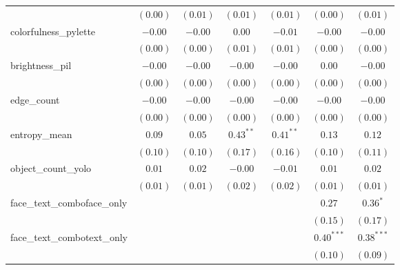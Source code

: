 \begin{table}
\begin{center}
\begin{tabular}{l c c c c c c}
                            & $(0.00)$        & $(0.01)$       & $(0.01)$        & $(0.01)$      & $(0.00)$        & $(0.01)$       \\
colorfulness\_pylette       & $-0.00$         & $-0.00$        & $0.00$          & $-0.01$       & $-0.00$         & $-0.00$        \\
                            & $(0.00)$        & $(0.00)$       & $(0.01)$        & $(0.01)$      & $(0.00)$        & $(0.00)$       \\
brightness\_pil             & $-0.00$         & $-0.00$        & $-0.00$         & $-0.00$       & $0.00$          & $-0.00$        \\
                            & $(0.00)$        & $(0.00)$       & $(0.00)$        & $(0.00)$      & $(0.00)$        & $(0.00)$       \\
edge\_count                 & $-0.00$         & $-0.00$        & $-0.00$         & $-0.00$       & $-0.00$         & $-0.00$        \\
                            & $(0.00)$        & $(0.00)$       & $(0.00)$        & $(0.00)$      & $(0.00)$        & $(0.00)$       \\
entropy\_mean               & $0.09$          & $0.05$         & $0.43^{**}$     & $0.41^{**}$   & $0.13$          & $0.12$         \\
                            & $(0.10)$        & $(0.10)$       & $(0.17)$        & $(0.16)$      & $(0.10)$        & $(0.11)$       \\
object\_count\_yolo         & $0.01$          & $0.02$         & $-0.00$         & $-0.01$       & $0.01$          & $0.02$         \\
                            & $(0.01)$        & $(0.01)$       & $(0.02)$        & $(0.02)$      & $(0.01)$        & $(0.01)$       \\
face\_text\_comboface\_only &                 &                &                 &               & $0.27$          & $0.36^{*}$     \\
                            &                 &                &                 &               & $(0.15)$        & $(0.17)$       \\
face\_text\_combotext\_only &                 &                &                 &               & $0.40^{***}$    & $0.38^{***}$   \\
                            &                 &                &                 &               & $(0.10)$        & $(0.09)$       \\

\end{tabular}
\end{center}
\end{table}
